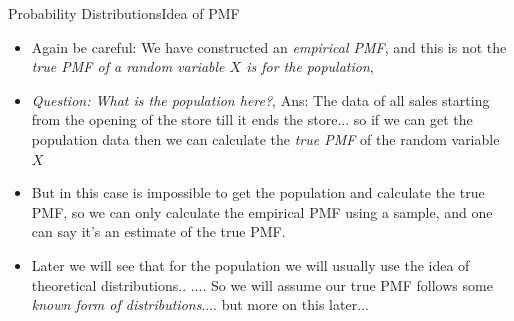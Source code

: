 \documentclass[8pt, usepdftitle = false]{beamer}
\newcounter{mytheorem}
\renewcommand{\themytheorem}{3.\arabic{mytheorem}}
\newcommand{\Thm}[1]{\refstepcounter{mytheorem}\textbf{#1\color{blue}\themytheorem}:}
\begin{document}
\begin{frame}[allowframebreaks]{Probability Distributions}{Idea of PMF}
\begin{itemize}
\medskip




\item \alert{Again be careful:} We have constructed an \emph{empirical PMF}, and this is not the \emph{true PMF of a random variable $X$ is for the population}, 

\item \emph{Question: What is the population here?}, \alert{Ans:} The data of all sales starting from the opening of the store till it ends the store... so if we can get the population data then we can calculate the \emph{true PMF} of the random variable $X$


\item But in this case is impossible to get the population and calculate the true PMF, so we can only calculate the empirical PMF using a sample, and one can say it's an estimate of the true PMF.

\item Later we will see that for the population we will usually use the idea of theoretical distributions.. .... So we will assume our true PMF follows some \emph{known form of distributions}.... but more on this later...
















\end{itemize}
\end{frame}
\end{document}
